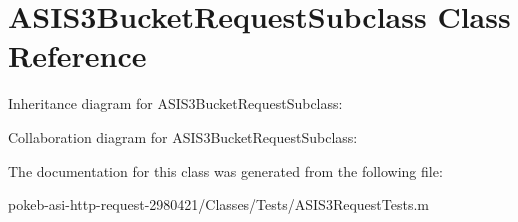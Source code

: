\hypertarget{interface_a_s_i_s3_bucket_request_subclass}{
\section{\-A\-S\-I\-S3\-Bucket\-Request\-Subclass \-Class \-Reference}
\label{interface_a_s_i_s3_bucket_request_subclass}
}


\-Inheritance diagram for \-A\-S\-I\-S3\-Bucket\-Request\-Subclass\-:


\-Collaboration diagram for \-A\-S\-I\-S3\-Bucket\-Request\-Subclass\-:


\-The documentation for this class was generated from the following file\-:\begin{DoxyCompactItemize}
\item 
pokeb-\/asi-\/http-\/request-\/2980421/\-Classes/\-Tests/\-A\-S\-I\-S3\-Request\-Tests.\-m\end{DoxyCompactItemize}
